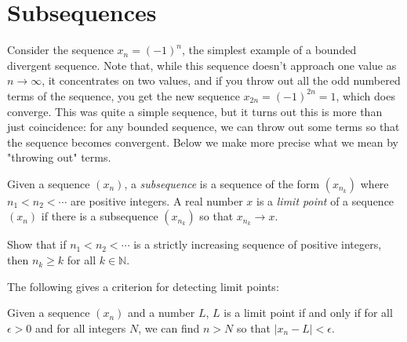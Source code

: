 \documentclass[11pt,dvipsnames]{book}
\numberwithin{figure}{section} %
\numberwithin{table}{section} %
\begin{document}
\section{Subsequences}

Consider the sequence $x_n=(-1)^{n}$, the simplest example of a bounded divergent sequence. Note that, while this sequence doesn't approach one value as $n\rightarrow\infty$, it concentrates on two values, and if you throw out all the odd numbered terms of the sequence, you get the new sequence $x_{2n}=(-1)^{2n}=1$, which does converge. This was quite a simple sequence, but it turns out this is more than just coincidence: for any bounded sequence, we can throw out some terms so that the sequence becomes convergent. Below we make more precise what we mean by "throwing out" terms.

\begin{definition}
Given a sequence $(x_{n})$, a {\it subsequence} is a sequence of the form $(x_{n_{k}})$ where $n_{1}<n_{2}<\cdots $ are positive integers. A real number $x$ is a {\it limit point} of a sequence $(x_{n})$ if there is a subsequence $(x_{n_{k}})$ so that $x_{n_{k}}\rightarrow x$.
\end{definition}

\begin{exercise}
Show that if $n_{1}<n_{2}<\cdots $ is a strictly increasing sequence of positive integers, then $n_k\geq k$ for all $k\in\mathbb{N}$.
\end{exercise}

The following gives a criterion for detecting limit points:

\begin{proposition}
\label{p:lim-points}
Given a sequence $(x_n)$ and a number $L$, $L$ is a limit point if and only if for all $\epsilon>0$ and for all integers $N$, we can find $n> N$ so that $|x_n-L|<\epsilon$.
\end{proposition}
\end{document}
